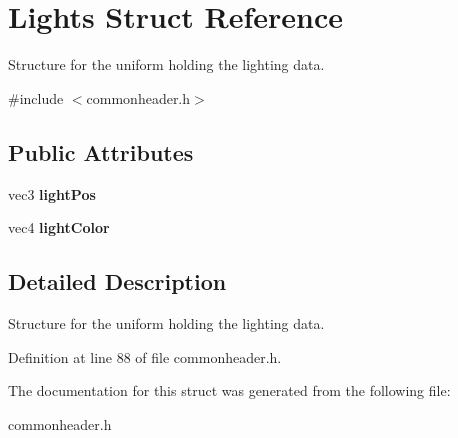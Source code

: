 \hypertarget{structLights}{}\section{Lights Struct Reference}
\label{structLights}


Structure for the uniform holding the lighting data.  




{\ttfamily \#include $<$commonheader.\+h$>$}

\subsection*{Public Attributes}
\begin{DoxyCompactItemize}
\item 
\mbox{\label{structLights_a346d1c9e1feac0aa14dc21719238e0ea}} 
vec3 {\bfseries light\+Pos}
\item 
\mbox{\label{structLights_ae03bc1a0f94b14b6239ba3a0494b081c}} 
vec4 {\bfseries light\+Color}
\end{DoxyCompactItemize}


\subsection{Detailed Description}
Structure for the uniform holding the lighting data. 

Definition at line 88 of file commonheader.\+h.



The documentation for this struct was generated from the following file\+:\begin{DoxyCompactItemize}
\item 
commonheader.\+h\end{DoxyCompactItemize}
